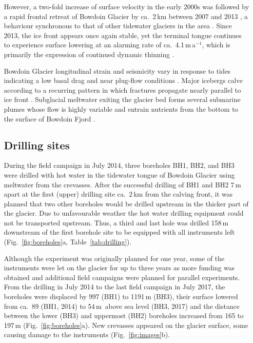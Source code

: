 \documentclass[utf8]{article}
\begin{document}
    However, a two-fold increase of surface velocity in the early 2000s was
    followed by a rapid frontal retreat of Bowdoin Glacier by ca.~2\,km between
    2007 and 2013 \citep[Fig.~2]{Sugiyama.etal.2015}, a behaviour synchronous
    to that of other tidewater glaciers in the area
    \citep{Sakakibara.Sugiyama.2018}. Since 2013, the ice front appears once
    again stable, yet the terminal tongue continues to experience surface
    lowering at an alarming rate of ca.~4.1\,m\,a$^{-1}$, which is primarily
    the expression of continued dynamic thinning \citep{Tsutaki.etal.2016}.

    Bowdoin Glacier longitudinal strain and seismicity vary in response to
    tides~\citep{Podolskiy.etal.2016, Podolskiy.etal.2017} indicating a low
    basal drag and near plug-flow conditions \citep{Seddik.etal.2019}. Major
    icebergs calve according to a recurring pattern in which fractures
    propagate nearly parallel to ice front \citep{Jouvet.etal.2017}. Subglacial
    meltwater exiting the glacier bed forms several submarine plumes whose flow
    is highly variable \citep{Jouvet.etal.2018} and entrain nutrients from the
    bottom to the surface of Bowdoin Fjord \citep{Kanna.etal.2018}.


\subsection{Drilling sites}

    During the field campaign in July 2014, three boreholes BH1, BH2, and BH3
    were drilled with hot water in the tidewater tongue of Bowdoin Glacier
    using meltwater from the crevasses. After the successful drilling of BH1
    and BH2 7\,m apart at the first (upper) drilling site ca.~2\,km from the
    calving front, it was planned that two other boreholes would be drilled
    upstream in the thicker part of the glacier. Due to unfavourable weather the
    hot water drilling equipment could not be transported upstream. Thus, a
    third
    and last hole was drilled 158\,m downstream of the first borehole site
    to be equipped with all instruments left (Fig.~\ref{fig:boreholes}a,
    Table~\ref{tab:drilling}).

    Although the experiment was originally planned for one year, some of the
    instruments were let on the glacier for up to three years as more funding
    was obtained and additional field campaigns were planned for parallel
    experiments. From the drilling in July 2014 to the last field campaign in
    July 2017, the boreholes were displaced by 997 (BH1) to 1191\,m (BH3),
    their surface lowered from ca.~89 (BH1, 2014) to 54\,m~above sea level
    (BH3, 2017) and
    the distance between the lower (BH3) and uppermost (BH2) boreholes
    increased from 165 to 197\,m (Fig.~\ref{fig:boreholes}a). New crevasses
    appeared on the glacier surface, some causing damage to the instruments
    (Fig.~\ref{fig:images}b).
\end{document}
